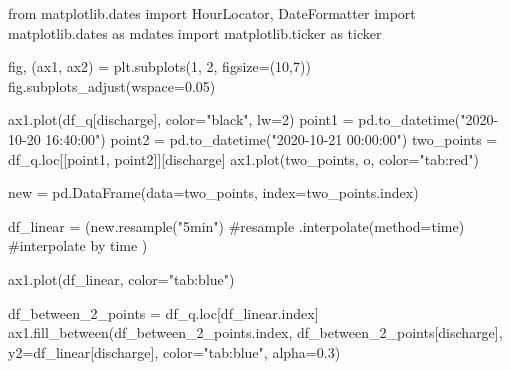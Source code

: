\documentclass[
  letterpaper,
  DIV=11,
  numbers=noendperiod]{scrreprt}
\newenvironment{Shaded}{\begin{snugshade}}{\end{snugshade}}
\newcommand{\CommentTok}[1]{\textcolor[rgb]{0.37,0.37,0.37}{#1}}
\newcommand{\DecValTok}[1]{\textcolor[rgb]{0.68,0.00,0.00}{#1}}
\newcommand{\FloatTok}[1]{\textcolor[rgb]{0.68,0.00,0.00}{#1}}
\newcommand{\ImportTok}[1]{\textcolor[rgb]{0.00,0.46,0.62}{#1}}
\newcommand{\NormalTok}[1]{\textcolor[rgb]{0.00,0.23,0.31}{#1}}
\newcommand{\OperatorTok}[1]{\textcolor[rgb]{0.37,0.37,0.37}{#1}}
\newcommand{\StringTok}[1]{\textcolor[rgb]{0.13,0.47,0.30}{#1}}
\begin{document}
\begin{Shaded}
\begin{Highlighting}[]
\ImportTok{from}\NormalTok{ matplotlib.dates }\ImportTok{import}\NormalTok{ HourLocator, DateFormatter}
\ImportTok{import}\NormalTok{ matplotlib.dates }\ImportTok{as}\NormalTok{ mdates}
\ImportTok{import}\NormalTok{ matplotlib.ticker }\ImportTok{as}\NormalTok{ ticker}

\NormalTok{fig, (ax1, ax2) }\OperatorTok{=}\NormalTok{ plt.subplots(}\DecValTok{1}\NormalTok{, }\DecValTok{2}\NormalTok{, figsize}\OperatorTok{=}\NormalTok{(}\DecValTok{10}\NormalTok{,}\DecValTok{7}\NormalTok{))}
\NormalTok{fig.subplots\_adjust(wspace}\OperatorTok{=}\FloatTok{0.05}\NormalTok{)}

\NormalTok{ax1.plot(df\_q[}\StringTok{\textquotesingle{}discharge\textquotesingle{}}\NormalTok{], color}\OperatorTok{=}\StringTok{"black"}\NormalTok{, lw}\OperatorTok{=}\DecValTok{2}\NormalTok{)}
\NormalTok{point1 }\OperatorTok{=}\NormalTok{ pd.to\_datetime(}\StringTok{"2020{-}10{-}20 16:40:00"}\NormalTok{)}
\NormalTok{point2 }\OperatorTok{=}\NormalTok{ pd.to\_datetime(}\StringTok{"2020{-}10{-}21 00:00:00"}\NormalTok{)}
\NormalTok{two\_points }\OperatorTok{=}\NormalTok{ df\_q.loc[[point1, point2]][}\StringTok{\textquotesingle{}discharge\textquotesingle{}}\NormalTok{]}
\NormalTok{ax1.plot(two\_points, }\StringTok{\textquotesingle{}o\textquotesingle{}}\NormalTok{, color}\OperatorTok{=}\StringTok{"tab:red"}\NormalTok{)}

\NormalTok{new }\OperatorTok{=}\NormalTok{ pd.DataFrame(data}\OperatorTok{=}\NormalTok{two\_points, index}\OperatorTok{=}\NormalTok{two\_points.index)}

\NormalTok{df\_linear }\OperatorTok{=}\NormalTok{ (new.resample(}\StringTok{"5min"}\NormalTok{) }\CommentTok{\#resample}
\NormalTok{                .interpolate(method}\OperatorTok{=}\StringTok{\textquotesingle{}time\textquotesingle{}}\NormalTok{) }\CommentTok{\#interpolate by time}
\NormalTok{            )}

\NormalTok{ax1.plot(df\_linear, color}\OperatorTok{=}\StringTok{"tab:blue"}\NormalTok{)}

\NormalTok{df\_between\_2\_points }\OperatorTok{=}\NormalTok{ df\_q.loc[df\_linear.index]}
\NormalTok{ax1.fill\_between(df\_between\_2\_points.index, df\_between\_2\_points[}\StringTok{\textquotesingle{}discharge\textquotesingle{}}\NormalTok{],}
\NormalTok{                 y2}\OperatorTok{=}\NormalTok{df\_linear[}\StringTok{\textquotesingle{}discharge\textquotesingle{}}\NormalTok{],}
\NormalTok{                 color}\OperatorTok{=}\StringTok{"tab:blue"}\NormalTok{, alpha}\OperatorTok{=}\FloatTok{0.3}\NormalTok{)}


\end{Highlighting}
\end{Shaded}
\end{document}

